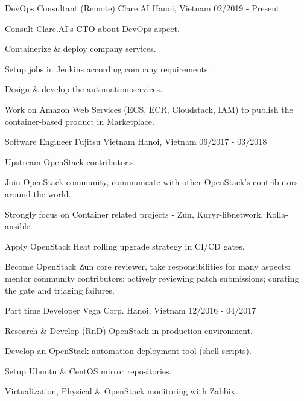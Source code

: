 \begin{cventries}
  \cventry
    {DevOps Consultant (Remote)} %
    {Clare.AI} %
    {Hanoi, Vietnam} %
    {02/2019 - Present} %
    {
      \begin{cvitems} %
        \item {Consult Clare.AI's CTO about DevOps aspect.}
        \item {Containerize \& deploy company services.}
        \item {Setup jobs in Jenkins according company requirements.}
        \item {Design \& develop the automation services.}
        \item {Work on Amazon Web Services (ECS, ECR, Cloudstack, IAM) to publish the container-based product in Marketplace.}
      \end{cvitems}
    }

  \cventry
    {Software Engineer} %
    {Fujitsu Vietnam} %
    {Hanoi, Vietnam} %
    {06/2017 - 03/2018} %
    {
      \begin{cvitems} %
      	\item {Upstream OpenStack contributor.s}
      	\item {Join OpenStack community, communicate with other OpenStack's contributors around the world.}
        \item {Strongly focus on Container related projects - Zun, Kuryr-libnetwork, Kolla-ansible.}
        \item {Apply OpenStack Heat rolling upgrade strategy in CI/CD gates.}
        \item {Become OpenStack Zun core reviewer, take responsibilities for many aspects: mentor community contributors; actively reviewing patch submissions; curating the gate and triaging failures.}
      \end{cvitems}
    }

  \cventry
    {Part time Developer} %
    {Vega Corp.} %
    {Hanoi, Vietnam} %
    {12/2016 - 04/2017} %
    {
      \begin{cvitems} %
        \item {Research \& Develop (RnD) OpenStack in production environment.}
        \item {Develop an OpenStack automation deployment tool (shell scripts).}
        \item {Setup Ubuntu \& CentOS mirror repositories.}
        \item {Virtualization, Physical \& OpenStack monitoring with Zabbix.}
      \end{cvitems}
    }


\end{cventries}
